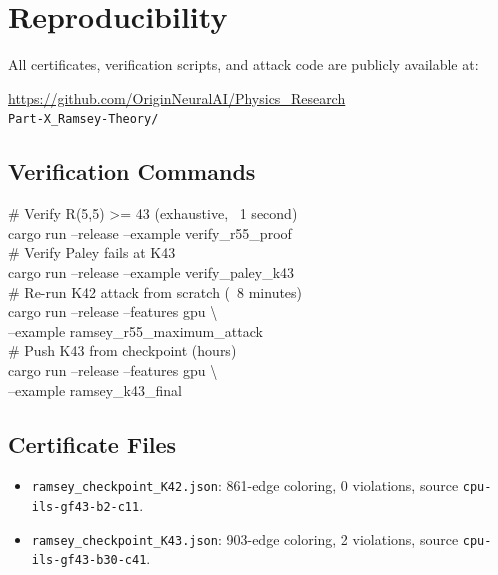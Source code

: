 \documentclass[11pt,a4paper]{article}
\theoremstyle{plain}
\theoremstyle{remark}
\begin{document}
\section{Reproducibility}

All certificates, verification scripts, and attack code are publicly
available at:

\begin{center}
\url{https://github.com/OriginNeuralAI/Physics_Research}\\
\texttt{Part-X\_Ramsey-Theory/}
\end{center}

\subsection{Verification Commands}

\begin{tcolorbox}[colback=reedsbg, colframe=accent!50, fontupper=\small\ttfamily,
  title={\small\bfseries Verification \& Reproduction}, coltitle=white,
  colbacktitle=accent]
\# Verify R(5,5) >= 43 (exhaustive, ~1 second)\\
cargo run --release --example verify\_r55\_proof\\[4pt]
\# Verify Paley fails at K43\\
cargo run --release --example verify\_paley\_k43\\[4pt]
\# Re-run K42 attack from scratch (~8 minutes)\\
cargo run --release --features gpu \textbackslash\\
\quad --example ramsey\_r55\_maximum\_attack\\[4pt]
\# Push K43 from checkpoint (hours)\\
cargo run --release --features gpu \textbackslash\\
\quad --example ramsey\_k43\_final
\end{tcolorbox}

\subsection{Certificate Files}

\begin{itemize}[leftmargin=2em]
  \item \texttt{ramsey\_checkpoint\_K42.json}: 861-edge coloring,
    0 violations, source \texttt{cpu-ils-gf43-b2-c11}.
  \item \texttt{ramsey\_checkpoint\_K43.json}: 903-edge coloring,
    2 violations, source \texttt{cpu-ils-gf43-b30-c41}.
\end{itemize}
\end{document}
